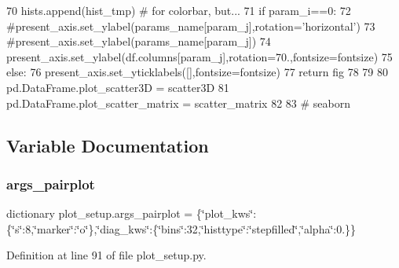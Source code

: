 \begin{DoxyCode}
70             hists.append(hist\_tmp) \textcolor{comment}{# for colorbar, but...}
71             \textcolor{keywordflow}{if} param\_i==0:
72                 \textcolor{comment}{#present\_axis.set\_ylabel(params\_name[param\_j],rotation='horizontal')}
73                 \textcolor{comment}{#present\_axis.set\_ylabel(params\_name[param\_j])}
74                 present\_axis.set\_ylabel(df.columns[param\_j],rotation=70.,fontsize=fontsize)
75             \textcolor{keywordflow}{else}:
76                 present\_axis.set\_yticklabels([],fontsize=fontsize)
77     \textcolor{keywordflow}{return} fig
78 
79 
80 pd.DataFrame.plot\_scatter3D = scatter3D
81 pd.DataFrame.plot\_scatter\_matrix = scatter\_matrix
82 
83 \textcolor{comment}{# seaborn}
\end{DoxyCode}


\subsection{Variable Documentation}
\mbox{\label{namespaceplot__setup_a8623d9c662ed254a9fdbb579db7c57c2}} 
\subsubsection{\texorpdfstring{args\+\_\+pairplot}{args\_pairplot}}
{\footnotesize\ttfamily dictionary plot\+\_\+setup.\+args\+\_\+pairplot = \{\char`\"{}plot\+\_\+kws\char`\"{}\+:\{\char`\"{}s\char`\"{}\+:8,\char`\"{}marker\char`\"{}\+:\char`\"{}o\char`\"{}\},\char`\"{}diag\+\_\+kws\char`\"{}\+:\{\char`\"{}bins\char`\"{}\+:32,\char`\"{}histtype\char`\"{}\+:\char`\"{}stepfilled\char`\"{},\char`\"{}alpha\char`\"{}\+:0.\}\}}



Definition at line 91 of file plot\+\_\+setup.\+py.

